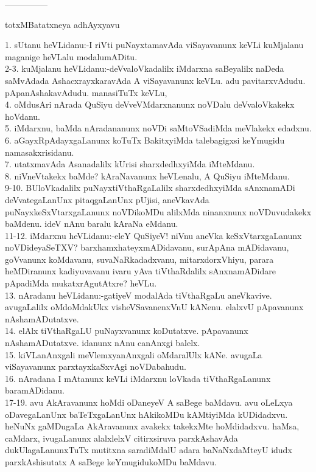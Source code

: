 \documentclass{article}
\begin{document}
\begin{center}
---------------
\end{center}

\begin{center}
totxMBatatxneya adhAyxyavu
\end{center}

1. sUtanu heVLidanu:-I riVti puNayxtamavAda viSayavanunx keVLi kuMjalanu maganige heVLalu modalumADitu.\\
2-3. kuMjalanu heVLidanu:-deVvaloVkadalilx iMdarxna saBeyalilx naDeda saMvAdada AshacxrayxkaravAda A viSayavanunx keVLu. adu pavitarxvAdudu. pApanAshakavAdudu. manasiTuTx keVLu,\\
4. oMdusAri nArada QuSiyu deVveVMdarxnanunx noVDalu deVvaloVkakekx hoVdanu.\\
5. iMdarxnu, baMda nAradananunx noVDi saMtoVSadiMda meVlakekx edadxnu.\\
6. aGayxRpAdayxgaLanunx koTuTx BakitxyiMda talebagigxsi keYmugidu namasakxrisidanu.\\
7. utatxmavAda Asanadalilx kUrisi sharxdedhxyiMda iMteMdanu.\\
8. niVneVtakekx baMde? kAraNavanunx heVLenalu, A QuSiyu iMteMdanu.\\
9-10. BUloVkadalilx puNayxtiVthaRgaLalilx sharxdedhxyiMda sAnxnamADi deVvategaLanUnx pitaqgaLanUnx pUjisi, aneVkavAda puNayxkeSxVtarxgaLanunx noVDikoMDu alilxMda ninanxnunx noVDuvudakekx baMdenu. ideV nAnu baralu kAraNa eMdanu.\\
11-12. iMdarxnu heVLidanu:-eleY QuSiyeV! niVnu aneVka keSxVtarxgaLanunx noVDideyaSeTXV? barxhamxhateyxmADidavanu, surApAna mADidavanu, goVvanunx koMdavanu, suvaNaRkadadxvanu, mitarxdorxVhiyu, parara heMDiranunx kadiyuvavanu ivaru yAva tiVthaRdalilx sAnxnamADidare pApadiMda mukatxrAgutAtxre? heVLu.\\
13. nAradanu heVLidanu:-gatiyeV modalAda tiVthaRgaLu aneVkavive. avugaLalilx oMdoMdakUkx visheVSavanenxVnU kANenu. elalxvU pApavanunx nAshamADutatxve.\\
14. elAlx tiVthaRgaLU puNayxvanunx koDutatxve. pApavanunx nAshamADutatxve. idanunx nAnu canAnxgi balelx.\\
15. kiVLanAnxgali meVlemxyanAnxgali oMdaralUlx kANe. avugaLa viSayavanunx parxtayxkaSxvAgi noVDabahudu.\\
16. nAradana I mAtanunx keVLi iMdarxnu loVkada tiVthaRgaLanunx baramADidanu.\\
17-19. avu AkAravanunx hoMdi oDaneyeV A saBege baMdavu. avu oLeLxya oDavegaLanUnx baTeTxgaLanUnx hAkikoMDu kAMtiyiMda kUDidadxvu. heNuNx gaMDugaLa AkAravanunx avakekx takekxMte hoMdidadxvu. haMsa, caMdarx, ivugaLanunx alalxlelxV citirxsiruva parxkAshavAda dukUlagaLanunxTuTx mutitxna saradiMdalU adara baNaNxdaMteyU idudx parxkAshisutatx A saBege keYmugidukoMDu baMdavu.\\
\end{document}
